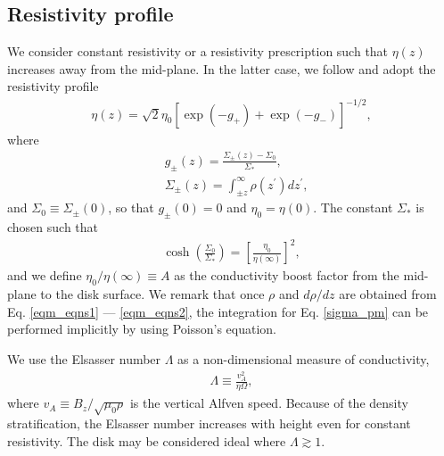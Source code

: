 \subsection{Resistivity profile}\label{resis_profile}
We consider constant resistivity or a 
resistivity prescription such that $\eta(z)$ increases away from the
mid-plane. In the latter case, we follow \cite{fleming03} and adopt the
resistivity profile 
\begin{align}
  \eta(z) =
  \sqrt{2}\eta_0\left[\exp{\left(-g_+\right)}+\exp{\left(-g_-\right)}\right]^{-1/2},  
\end{align}
where
\begin{align}
  &g_\pm(z) =  \frac{\Sigma_\pm(z)-\Sigma_0}{\Sigma_*}, \\
  &\Sigma_\pm(z) = \int_{\pm z}^\infty\rho(z^\prime)dz^\prime, \label{sigma_pm}
\end{align}
and $\Sigma_0\equiv\Sigma_{\pm}(0)$, so that $g_\pm(0)=0$ and $\eta_0 
= \eta(0)$. The constant $\Sigma_*$ is chosen such that 
\begin{align}
  \cosh{\left(\frac{\Sigma_0}{\Sigma_*}\right)} =
  \left[\frac{\eta_0}{\eta(\infty)}\right]^2,
\end{align}
and we define $\eta_0/\eta(\infty)\equiv A$ as the conductivity 
boost factor from the mid-plane to the disk surface. We remark that
once $\rho$ and $d\rho/dz$ are obtained from
Eq. \ref{eqm_eqns1} --- \ref{eqm_eqns2}, the integration for
Eq. \ref{sigma_pm} can be performed implicitly by using Poisson's 
equation. 

We use the Elsasser number $\Lambda$ as a non-dimensional measure of
conductivity,
\begin{align} 
  \Lambda \equiv \frac{v_A^2}{\eta\Omega},
\end{align}
where $v_A \equiv B_z/\sqrt{\mu_0\rho}$ is the vertical Alfven speed. 
Because of the density stratification, the Elsasser number 
increases with height even for constant resistivity. The disk may be
considered ideal where $\Lambda \gtrsim 1$. 



